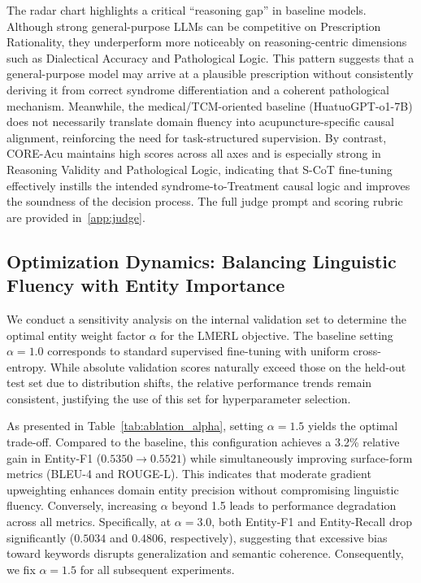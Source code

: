 \documentclass[preprint,5p,times,twocolumn,fleqn]{elsarticle}
\begin{document}
The radar chart highlights a critical ``reasoning gap'' in baseline models. Although strong general-purpose LLMs can be competitive on Prescription Rationality, they underperform more noticeably on reasoning-centric dimensions such as Dialectical Accuracy and Pathological Logic. This pattern suggests that a general-purpose model may arrive at a plausible prescription without consistently deriving it from correct syndrome differentiation and a coherent pathological mechanism.
Meanwhile, the medical/TCM-oriented baseline (HuatuoGPT-o1-7B) does not necessarily translate domain fluency into acupuncture-specific causal alignment, reinforcing the need for task-structured supervision.
By contrast, CORE-Acu maintains high scores across all axes and is especially strong in Reasoning Validity and Pathological Logic, indicating that S-CoT fine-tuning effectively instills the intended syndrome-to-Treatment causal logic and improves the soundness of the decision process. The full judge prompt and scoring rubric are provided in~\ref{app:judge}.


\subsection{Optimization Dynamics: Balancing Linguistic Fluency with Entity Importance}
\label{sec:sensitivity_alpha}

We conduct a sensitivity analysis on the internal validation set to determine the optimal entity weight factor $\alpha$ for the LMERL objective. The baseline setting $\alpha=1.0$ corresponds to standard supervised fine-tuning with uniform cross-entropy. While absolute validation scores naturally exceed those on the held-out test set due to distribution shifts, the relative performance trends remain consistent, justifying the use of this set for hyperparameter selection.

As presented in Table~\ref{tab:ablation_alpha}, setting $\alpha=1.5$ yields the optimal trade-off. Compared to the baseline, this configuration achieves a 3.2\% relative gain in Entity-F1 ($0.5350 \to 0.5521$) while simultaneously improving surface-form metrics (BLEU-4 and ROUGE-L). This indicates that moderate gradient upweighting enhances domain entity precision without compromising linguistic fluency. Conversely, increasing $\alpha$ beyond 1.5 leads to performance degradation across all metrics. Specifically, at $\alpha=3.0$, both Entity-F1 and Entity-Recall drop significantly ($0.5034$ and $0.4806$, respectively), suggesting that excessive bias toward keywords disrupts generalization and semantic coherence. Consequently, we fix $\alpha=1.5$ for all subsequent experiments.
\end{document}
